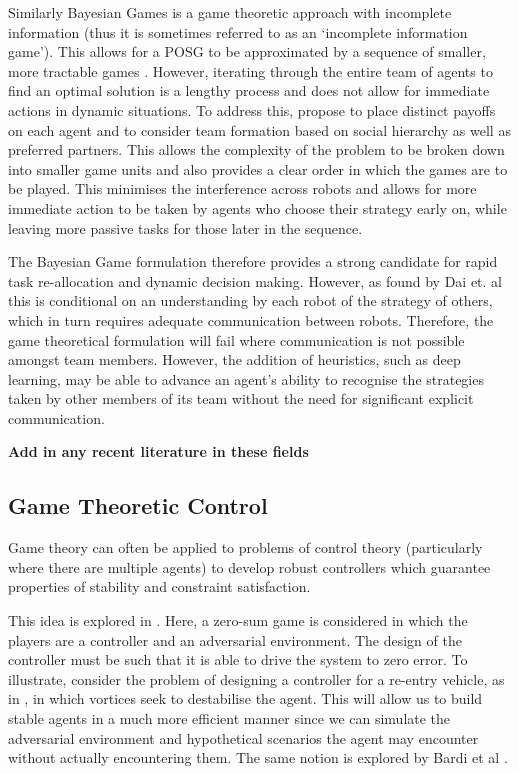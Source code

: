 \documentclass[.../main.tex]{subfiles}
\begin{document}
Similarly Bayesian Games is a game theoretic approach with incomplete information (thus it is sometimes referred to as an ‘incomplete information game’). This allows for a POSG to be approximated by a sequence of smaller, more tractable games \cite{Emery-MontemerloApproximatePayoffs}. However, iterating through the entire team of agents to find an optimal solution is a lengthy process and does not allow for immediate actions in dynamic situations. To address this, \cite{Ray2010AnCooperation} propose to place distinct payoffs on each agent and to consider team formation based on social hierarchy as well as preferred partners. This allows the complexity of the problem to be broken down into smaller game units and also provides a clear order in which the games are to be played. This minimises the interference across robots and allows for more immediate action to be taken by agents who choose their strategy early on, while leaving more passive tasks for those later in the sequence. 

The Bayesian Game formulation therefore provides a strong candidate for rapid task re-allocation and dynamic decision making. However, as found by Dai et. al \cite{Dai2018TaskSystems} this is conditional on an understanding by each robot of the strategy of others, which in turn requires adequate communication between robots. Therefore, the game theoretical formulation will fail where communication is not possible amongst team members. However, the addition of heuristics, such as deep learning, may be able to advance an agent’s ability to recognise the strategies taken by other members of its team without the need for significant explicit communication.

\textbf{Add in any recent literature in these fields}

\subsection{Game Theoretic Control} \label{Game Theoretic Control}

Game theory can often be applied to problems of control theory (particularly where there are
multiple agents) to develop robust controllers which guarantee properties of stability and
constraint satisfaction. 

This idea is explored in \cite{Marden2018AnnualControl}. Here, a zero-sum game is considered in
which the players are a controller and an adversarial environment. The design of the controller must
be such that it is able to drive the system to zero error. To illustrate, consider the problem of
designing a controller for a re-entry vehicle, as in \cite{Breitner1994ReentryGame}, in which
vortices seek to destabilise the agent. This will allow us to build stable agents in a much more
efficient manner since we can simulate the adversarial environment and hypothetical scenarios the
agent may encounter without actually encountering them. The same notion is explored by Bardi et al
\cite{Bardi1991DifferentialDisturbances}.
\end{document}
